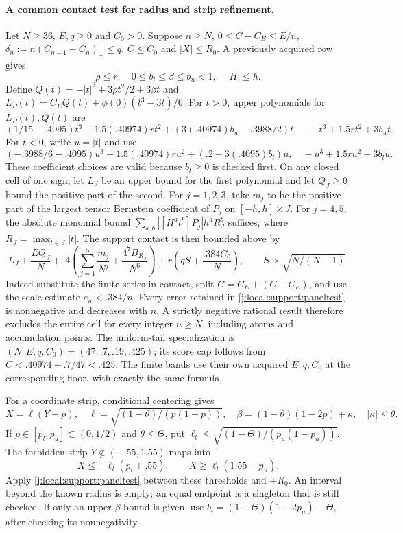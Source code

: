 \paragraph{A common contact test for radius and strip refinement.}
\label{j:local:support:panels}
Let $N\ge36$, $E,q\ge0$ and $C_0>0$. Suppose $n\ge N$,
$0\le C-C_E\le E/n$, $\delta_n:=n(C_{n-1}-C_n)_+\le q$, $C\le C_0$ and
$|X|\le R_0$. A previously acquired row gives
\[
 \rho\le r,\quad 0\le b_l\le\beta\le b_u<1,\quad |H|\le h.
\]
Define $Q(t)=-|t|^3+3\rho t^2/2+3\beta t$ and
$L_P(t)=C_EQ(t)+\phi(0)(t^3-3t)/6$.
For $t>0$, upper polynomials for $L_P(t),Q(t)$ are
\[
 (1/15-.4095)t^3+1.5(.40974)rt^2+(3(.40974)b_u-.3988/2)t,
 \quad -t^3+1.5rt^2+3b_ut.
\]
For $t<0$, write $u=|t|$ and use
\[
 (-.3988/6-.4095)u^3+1.5(.40974)ru^2+(.2-3(.4095)b_l)u,
 \quad -u^3+1.5ru^2-3b_lu.
\]
These coefficient choices are valid because $b_l\ge0$ is checked first.
On any closed cell of one sign, let $L_J$ be an upper bound for the
first polynomial and let $Q_J\ge0$ bound the positive part of the second.
For $j=1,2,3$, take $m_j$ to be the positive part of the largest tensor
Bernstein coefficient of $P_j$ on $[-h,h]\times J$. For $j=4,5$, the
absolute monomial bound
$\sum_{a,b}|[H^at^b]P_j|h^aR_J^b$ suffices, where
$R_J=\max_{t\in J}|t|$. The support contact is then bounded above by
\begin{equation}\label{j:local:support:paneltest}
 L_J+\frac{E Q_J}{N}
 +.4\left(\sum_{j=1}^5\frac{m_j}{N^j}
                +\frac{4^7B_{R_J}}{N^6}\right)
 +r\left(qS+\frac{.384C_0}{N}\right),
 \qquad S>\sqrt{N/(N-1)}.
\end{equation}
Indeed substitute the finite series in contact, split $C=C_E+(C-C_E)$,
and use the scale estimate $e_n<.384/n$. Every error retained in
\eqref{j:local:support:paneltest} is nonnegative and decreases with $n$.
A strictly negative rational result therefore excludes the entire cell
for every integer $n\ge N$, including atoms and accumulation points.
The uniform-tail specialization is $(N,E,q,C_0)=(47,.7,.19,.425)$;
its score cap follows from $C<.40974+.7/47<.425$.
The finite bands use their own acquired $E,q,C_0$ at the corresponding
floor, with exactly the same formula.

For a coordinate strip, conditional centering gives
\[
 X=\ell(Y-p),\quad
 \ell=\sqrt{(1-\theta)/(p(1-p))},\quad
 \beta=(1-\theta)(1-2p)+\kappa,\quad |\kappa|\le\theta.
\]
If $p\in[p_l,p_u]\subset(0,1/2)$ and $\theta\le\Theta$, put
$\ell_l\le\sqrt{(1-\Theta)/(p_u(1-p_u))}$.
The forbidden strip $Y\notin(-.55,1.55)$ maps into
\[
 X\le-\ell_l(p_l+.55),\qquad X\ge\ell_l(1.55-p_u).
\]
Apply \eqref{j:local:support:paneltest} between these thresholds and $\pm R_0$.
An interval beyond the known radius is empty; an equal endpoint is a
singleton that is still checked. If only an upper $\beta$ bound is given,
use $b_l=(1-\Theta)(1-2p_u)-\Theta$, after checking its nonnegativity.


